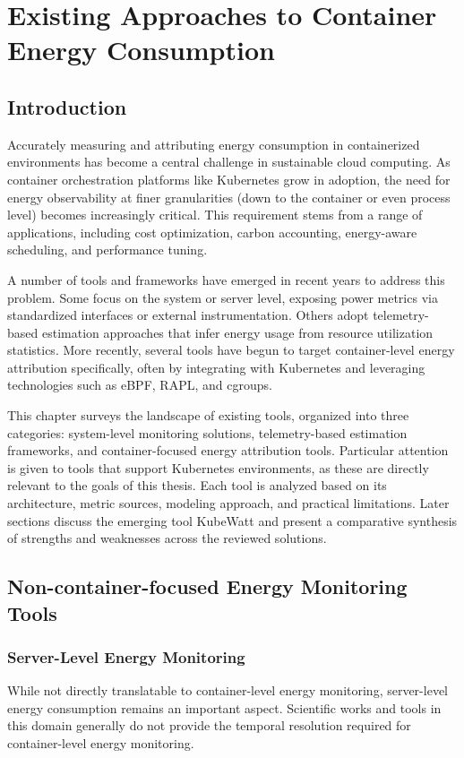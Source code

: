 \chapter{Existing Approaches to Container Energy Consumption}
\label{chap:tool-analysis}

\section{Introduction}
\label{sec:tool-intro}

Accurately measuring and attributing energy consumption in containerized environments has become a central challenge in sustainable cloud computing. As container orchestration platforms like Kubernetes grow in adoption, the need for energy observability at finer granularities (down to the container or even process level) becomes increasingly critical. This requirement stems from a range of applications, including cost optimization, carbon accounting, energy-aware scheduling, and performance tuning.

A number of tools and frameworks have emerged in recent years to address this problem. Some focus on the system or server level, exposing power metrics via standardized interfaces or external instrumentation. Others adopt telemetry-based estimation approaches that infer energy usage from resource utilization statistics. More recently, several tools have begun to target container-level energy attribution specifically, often by integrating with Kubernetes and leveraging technologies such as eBPF, RAPL, and cgroups.

This chapter surveys the landscape of existing tools, organized into three categories: system-level monitoring solutions, telemetry-based estimation frameworks, and container-focused energy attribution tools. Particular attention is given to tools that support Kubernetes environments, as these are directly relevant to the goals of this thesis. Each tool is analyzed based on its architecture, metric sources, modeling approach, and practical limitations. Later sections discuss the emerging tool KubeWatt and present a comparative synthesis of strengths and weaknesses across the reviewed solutions.

\section{Non-container-focused Energy Monitoring Tools}
\label{sec:non-k8s-tools}
\subsection{Server-Level Energy Monitoring}
\label{sec:server-tools}
While not directly translatable to container-level energy monitoring, server-level energy consumption remains an important aspect. Scientific works and tools in this domain generally do not provide the temporal resolution required for container-level energy monitoring.

